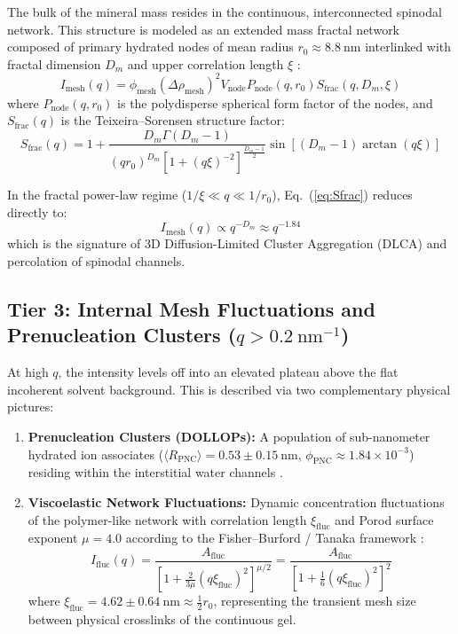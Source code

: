\documentclass[11pt,a4paper]{article}
\begin{document}
The bulk of the mineral mass resides in the continuous, interconnected spinodal network. This structure is modeled as an extended mass fractal network composed of primary hydrated nodes of mean radius $r_0 \approx 8.8\ \mathrm{nm}$ interlinked with fractal dimension $D_m$ and upper correlation length $\xi$ \cite{teixeira1988small, sorensen2001light}:
\begin{equation}
I_{\mathrm{mesh}}(q) = \phi_{\mathrm{mesh}} (\Delta \rho_{\mathrm{mesh}})^2 V_{\mathrm{node}} P_{\mathrm{node}}(q, r_0) S_{\mathrm{frac}}(q, D_m, \xi)
\label{eq:Imesh}
\end{equation}
where $P_{\mathrm{node}}(q, r_0)$ is the polydisperse spherical form factor of the nodes, and $S_{\mathrm{frac}}(q)$ is the Teixeira--Sorensen structure factor:
\begin{equation}
S_{\mathrm{frac}}(q) = 1 + \frac{D_m \Gamma(D_m - 1)}{(q r_0)^{D_m} [1 + (q\xi)^{-2}]^{\frac{D_m - 1}{2}}} \sin\left[ (D_m - 1) \arctan(q\xi) \right]
\label{eq:Sfrac}
\end{equation}

In the fractal power-law regime ($1/\xi \ll q \ll 1/r_0$), Eq.~(\ref{eq:Sfrac}) reduces directly to:
\begin{equation}
I_{\mathrm{mesh}}(q) \propto q^{-D_m} \approx q^{-1.84}
\end{equation}
which is the signature of 3D Diffusion-Limited Cluster Aggregation (DLCA) and percolation of spinodal channels.

\subsection{Tier 3: Internal Mesh Fluctuations and Prenucleation Clusters ($q > 0.2\ \mathrm{nm}^{-1}$)}

At high $q$, the intensity levels off into an elevated plateau above the flat incoherent solvent background. This is described via two complementary physical pictures:
\begin{enumerate}
    \item \textbf{Prenucleation Clusters (DOLLOPs):} A population of sub-nanometer hydrated ion associates ($\langle R_{\mathrm{PNC}} \rangle = 0.53 \pm 0.15\ \mathrm{nm}$, $\phi_{\mathrm{PNC}} \approx 1.84 \times 10^{-3}$) residing within the interstitial water channels \cite{gebauer2008stable, demichelis2011stable}.
    \item \textbf{Viscoelastic Network Fluctuations:} Dynamic concentration fluctuations of the polymer-like network with correlation length $\xi_{\mathrm{fluc}}$ and Porod surface exponent $\mu = 4.0$ according to the Fisher--Burford / Tanaka framework \cite{tanaka2000viscoelastic, fisher1967theory}:
    \begin{equation}
    I_{\mathrm{fluc}}(q) = \frac{A_{\mathrm{fluc}}}{\left[ 1 + \frac{2}{3\mu} (q \xi_{\mathrm{fluc}})^2 \right]^{\mu / 2}} = \frac{A_{\mathrm{fluc}}}{\left[ 1 + \frac{1}{6} (q \xi_{\mathrm{fluc}})^2 \right]^2}
    \end{equation}
    where $\xi_{\mathrm{fluc}} = 4.62 \pm 0.64\ \mathrm{nm} \approx \frac{1}{2} r_0$, representing the transient mesh size between physical crosslinks of the continuous gel.
\end{enumerate}
\end{document}
